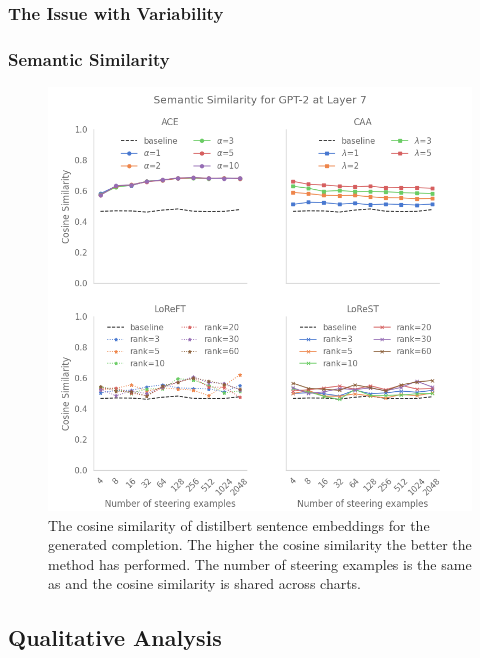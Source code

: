 \subsubsection{The Issue with Variability}
\label{sec:variability}

\subsubsection{Semantic Similarity}

\begin{figure}
    \centering
    \captionsetup{width=.9\textwidth}
    \includegraphics[width=\textwidth]{figures/gpt2_7_similarity.png}
    \caption{
        The cosine similarity of distilbert \citep{distilbert} sentence embeddings for the generated completion.
        The higher the cosine similarity the better the method has performed.
        The number of steering examples is the same as  and the cosine similarity is shared across charts.
    }
    \label{fig:gpt-pp-sim}
\end{figure}

\subsection{Qualitative Analysis}
\label{sec:qual}
